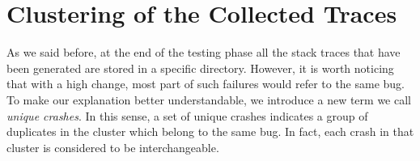

\clearpage
\section{Clustering of the Collected Traces}
\label{approach:clustering}
As we said before, at the end of the testing phase all the stack traces that have been generated are stored in a specific directory. However, it is worth noticing that with a high change, most part of such failures would refer to the same bug. %
To make our explanation better understandable, we introduce a new term we call \textit{unique crashes}. 
In this sense, a set of unique crashes indicates a group of duplicates in the cluster which belong to the same bug. In fact, each crash in that cluster is considered to be interchangeable.

